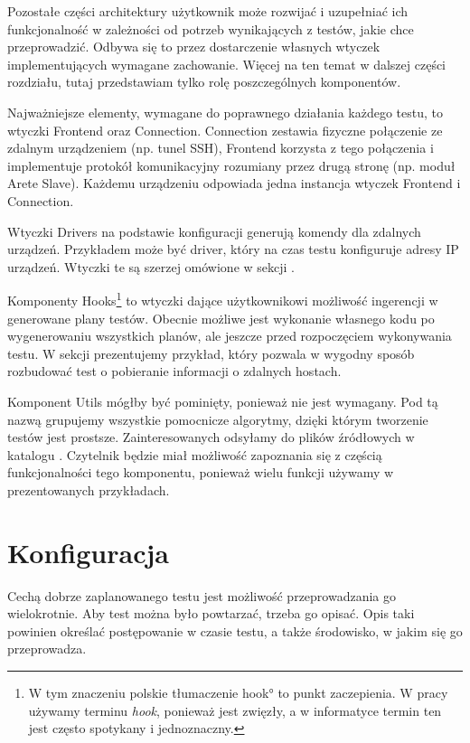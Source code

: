 \documentclass[00-praca-magisterska.tex]{subfiles}
\begin{document}
Pozostałe części architektury użytkownik może rozwijać i uzupełniać ich
funkcjonalność w zależności od potrzeb wynikających z testów, jakie chce
przeprowadzić. Odbywa się to przez dostarczenie własnych wtyczek
implementujących wymagane zachowanie. Więcej na ten temat w dalszej części
rozdziału, tutaj przedstawiam tylko rolę poszczególnych komponentów.

Najważniejsze elementy, wymagane do poprawnego działania każdego testu, to
wtyczki Frontend oraz Connection. Connection zestawia fizyczne połączenie ze
zdalnym urządzeniem (np. tunel SSH), Frontend korzysta z tego połączenia i
implementuje protokół komunikacyjny rozumiany przez drugą stronę (np. moduł
Arete Slave). Każdemu urządzeniu odpowiada jedna instancja wtyczek Frontend i
Connection.

Wtyczki Drivers na podstawie konfiguracji generują komendy dla zdalnych
urządzeń. Przykładem może być driver, który na czas testu konfiguruje adresy IP
urządzeń. Wtyczki te są szerzej omówione w sekcji .

Komponenty Hooks\footnote{W tym znaczeniu polskie tłumaczenie \ang{hook}
to punkt zaczepienia. W pracy używamy terminu \textit{hook}, ponieważ jest zwięzły, a w
informatyce termin ten jest często spotykany i jednoznaczny.} to wtyczki dające
użytkownikowi możliwość ingerencji w generowane plany testów. Obecnie możliwe
jest wykonanie własnego kodu po wygenerowaniu wszystkich planów, ale jeszcze
przed rozpoczęciem wykonywania testu. W sekcji 
prezentujemy przykład, który pozwala w wygodny sposób rozbudować test o
pobieranie informacji o zdalnych hostach.

Komponent Utils mógłby być pominięty, ponieważ nie jest wymagany. Pod tą nazwą
grupujemy wszystkie pomocnicze algorytmy, dzięki którym tworzenie testów jest
prostsze. Zainteresowanych odsyłamy do plików źródłowych w katalogu
. Czytelnik będzie miał możliwość zapoznania się z częścią
funkcjonalności tego komponentu, ponieważ wielu funkcji używamy w
prezentowanych przykładach.

\label{arete-master-config}
\section{Konfiguracja}

Cechą dobrze zaplanowanego testu jest możliwość przeprowadzania go
wielokrotnie. Aby test można było powtarzać, trzeba go opisać. Opis taki
powinien określać postępowanie w czasie testu, a także środowisko, w jakim się
go przeprowadza.
\end{document}
